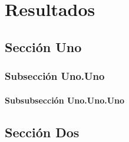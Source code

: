 \chapter{Resultados}
\label{resultados}
\lipsum[1-1]

\section{Sección Uno}

\par \lipsum[1-1]

\subsection{Subsección Uno.Uno}

\lipsum[3-3]

\subsubsection{Subsubsección Uno.Uno.Uno}

\lipsum[2-2]

\paragraph{\lipsum[4-4]}

\section{Sección Dos}

\par \lipsum[2-2]
